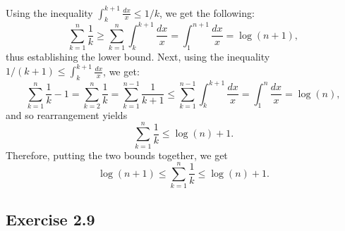\documentclass[12pt]{article}
\begin{document}
Using the inequality $\int_{k}^{k+1} \frac{dx}{x} \leq 1/k$, we get the following:
\begin{equation*}
\sum_{k=1}^n \frac{1}{k} \geq \sum_{k=1}^n \int_{k}^{k+1} \frac{dx}{x} = \int_1^{n+1} \frac{dx}{x} = \log(n+1),
\end{equation*}
thus establishing the lower bound. Next, using the inequality $1/(k+1) \leq \int_{k}^{k+1} \frac{dx}{x}$, we get:
\begin{equation*}
\sum_{k=1}^n \frac{1}{k} - 1 = \sum_{k=2}^n \frac{1}{k} = \sum_{k=1}^{n-1} \frac{1}{k+1} \leq \sum_{k=1}^{n-1} \int_{k}^{k+1} \frac{dx}{x} = \int_1^n \frac{dx}{x} = \log(n),
\end{equation*}
and so rearrangement yields
\begin{equation*}
\sum_{k=1}^n \frac{1}{k} \leq \log(n) + 1.
\end{equation*}
Therefore, putting the two bounds together, we get
\begin{equation*}
\log(n+1) \leq \sum_{k=1}^n \frac{1}{k} \leq \log(n) + 1.
\end{equation*}

\subsection*{Exercise 2.9}
\end{document}
